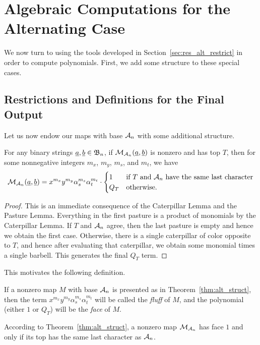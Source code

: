 \section{Algebraic Computations for the Alternating Case}
\label{sec:res_alt_compute}
We now turn to using the tools developed in Section~\ref{sec:res_alt_restrict} in order to compute polynomials. First, we add some structure to these special cases.

\subsection{Restrictions and Definitions for the Final Output}
Let us now endow our maps with base $\AA_n$ with some additional structure.
\begin{theorem}
	For any binary strings $\ul a, \ul b \in \BB_n$, if $\MM_{\AA_n} (\ul a, \ul b)$ is nonzero and has top $T$, then for some nonnegative integers $m_x$, $m_y$, $m_s$, and $m_t$, we have 
	\[
		\MM_{\AA_n} (\ul a, \ul b) =
		x^{m_x}y^{m_y}\alpha_s^{m_s}\alpha_t^{m_t} \cdot
		\begin{cases}
			1 & \text{if $T$ and $\AA_n$ have the same last character} \\
			Q_T & \text{otherwise}.
		\end{cases}
	\]
	\label{thm:alt_struct}
\end{theorem}
\begin{proof}
	This is an immediate consequence of the Caterpillar Lemma and the Pasture Lemma.  Everything in the first pasture is a product of monomials by the Caterpillar Lemma.  If $T$ and $\AA_n$ agree, then the last pasture is empty and hence we obtain the first case.  Otherwise, there is a single caterpillar of color opposite to $T$, and hence after evaluating that caterpillar, we obtain some monomial times a single barbell.  This generates the final $Q_T$ term.
\end{proof}

This motivates the following definition.
\begin{definition*}
	If a nonzero map $M$ with base $\AA_n$ is presented as in Theorem~\ref{thm:alt_struct}, then the term $x^{m_x}y^{m_y}\alpha_s^{m_s}\alpha_t^{m_t}$ will be called the \emph{fluff} of $M$, and the polynomial (either $1$ or $Q_T$) will be the \emph{face} of $M$. 
\end{definition*}
\begin{remark*}
	According to Theorem~\ref{thm:alt_struct}, a nonzero map $\MM_{\AA_n}$ has face $1$ and only if its top has the same last character as $\AA_n$.
\end{remark*}


